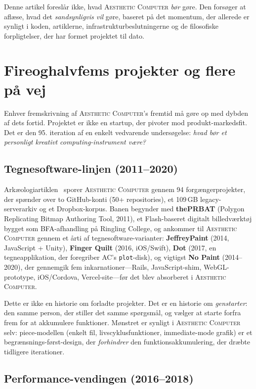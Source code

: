 \documentclass[10pt,letterpaper,twocolumn]{article}
\newcommand{\ac}{\textsc{Aesthetic Computer}}
\begin{document}
Denne artikel foreslår ikke, hvad \ac{} \emph{bør} gøre. Den forsøger at aflæse, hvad det \emph{sandsynligvis vil} gøre, baseret på det momentum, der allerede er synligt i koden, artiklerne, infrastrukturbeslutningerne og de filosofiske forpligtelser, der har formet projektet til dato.


\section{Fireoghalvfems projekter og flere på vej}
\label{sec:history}

Enhver fremskrivning af \ac{}'s fremtid må gøre op med dybden af dets fortid. Projektet er ikke en startup, der pivoter mod produkt-markedsfit. Det er den 95. iteration af en enkelt vedvarende undersøgelse: \emph{hvad bør et personligt kreativt computing-instrument være?}

\subsection{Tegnesoftware-linjen (2011--2020)}

Arkæologiartiklen~\citep{scudder2026archaeology} sporer \ac{} gennem 94 forgængerprojekter, der spænder over to GitHub-konti (50+ repositories), et 109\,GB legacy-serverarkiv og et Dropbox-korpus. Banen begynder med \textbf{thePRBAT} (Polygon Replicating Bitmap Authoring Tool, 2011), et Flash-baseret digitalt billedværktøj bygget som BFA-afhandling på Ringling College, og ankommer til \ac{} gennem et årti af tegnesoftware-varianter: \textbf{JeffreyPaint} (2014, JavaScript + Unity), \textbf{Finger Quilt} (2016, iOS/Swift), \textbf{Dot} (2017, en tegneapplikation, der foregriber AC's \texttt{plot}-disk), og vigtigst \textbf{No Paint} (2014--2020), der gennemgik fem inkarnationer---Rails, JavaScript-shim, WebGL-prototype, iOS/Cordova, Vercel-site---før det blev absorberet i \ac{}.

Dette er ikke en historie om forladte projekter. Det er en historie om \emph{genstarter}: den samme person, der stiller det samme spørgsmål, og vælger at starte forfra frem for at akkumulere funktioner. Mønstret er synligt i \ac{} selv: piece-modellen (enkelt fil, livscyklusfunktioner, immediate-mode grafik) er et begrænsnings-først-design, der \emph{forhindrer} den funktionsakkumulering, der dræbte tidligere iterationer.

\subsection{Performance-vendingen (2016--2018)}
\end{document}
